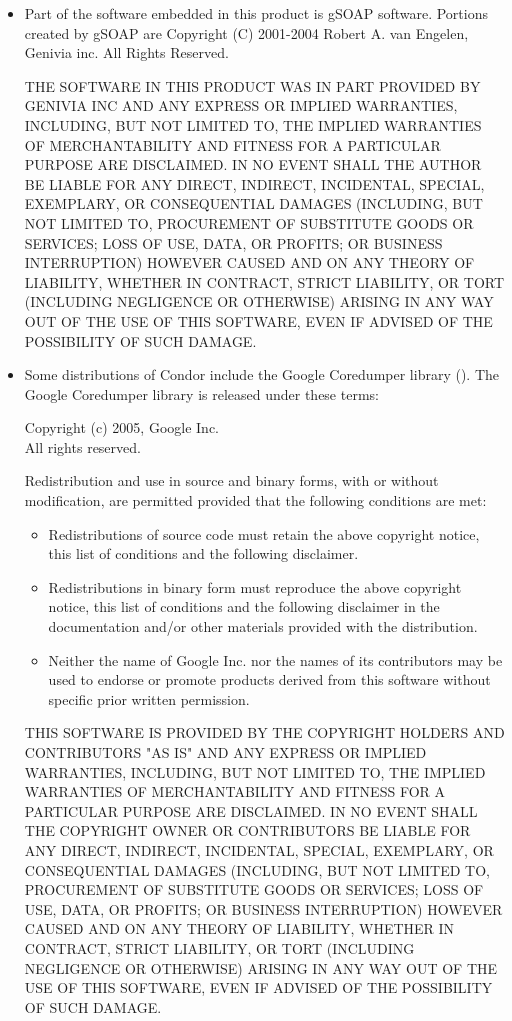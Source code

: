 \begin{itemize}
\item
Part of the software embedded in this product is gSOAP software.
Portions created by gSOAP are Copyright (C) 2001-2004 Robert A. van Engelen, Genivia inc. All Rights Reserved.

THE SOFTWARE IN THIS PRODUCT WAS IN PART PROVIDED BY GENIVIA INC AND ANY EXPRESS OR IMPLIED WARRANTIES, INCLUDING, BUT NOT LIMITED TO, THE IMPLIED WARRANTIES OF MERCHANTABILITY AND FITNESS FOR A PARTICULAR PURPOSE ARE DISCLAIMED. IN NO EVENT SHALL THE AUTHOR BE LIABLE FOR ANY DIRECT, INDIRECT, INCIDENTAL, SPECIAL, EXEMPLARY, OR CONSEQUENTIAL DAMAGES (INCLUDING, BUT NOT LIMITED TO, PROCUREMENT OF SUBSTITUTE GOODS OR SERVICES; LOSS OF USE, DATA, OR PROFITS; OR BUSINESS INTERRUPTION) HOWEVER CAUSED AND ON ANY THEORY OF LIABILITY, WHETHER IN CONTRACT, STRICT LIABILITY, OR TORT (INCLUDING NEGLIGENCE OR OTHERWISE) ARISING IN ANY WAY OUT OF THE USE OF THIS SOFTWARE, EVEN IF ADVISED OF THE POSSIBILITY OF SUCH DAMAGE.

\item
Some distributions of Condor include the Google Coredumper library
().  The Google Coredumper
library is released under these terms:

Copyright (c) 2005, Google Inc. \\
All rights reserved.

Redistribution and use in source and binary forms, with or without
modification, are permitted provided that the following conditions are
met:

	\begin{itemize}
    \item Redistributions of source code must retain the above copyright
notice, this list of conditions and the following disclaimer.

    \item Redistributions in binary form must reproduce the above
copyright notice, this list of conditions and the following disclaimer
in the documentation and/or other materials provided with the
distribution.

    \item Neither the name of Google Inc. nor the names of its
contributors may be used to endorse or promote products derived from
this software without specific prior written permission.
	\end{itemize}

THIS SOFTWARE IS PROVIDED BY THE COPYRIGHT HOLDERS AND CONTRIBUTORS
"AS IS" AND ANY EXPRESS OR IMPLIED WARRANTIES, INCLUDING, BUT NOT
LIMITED TO, THE IMPLIED WARRANTIES OF MERCHANTABILITY AND FITNESS FOR
A PARTICULAR PURPOSE ARE DISCLAIMED. IN NO EVENT SHALL THE COPYRIGHT
OWNER OR CONTRIBUTORS BE LIABLE FOR ANY DIRECT, INDIRECT, INCIDENTAL,
SPECIAL, EXEMPLARY, OR CONSEQUENTIAL DAMAGES (INCLUDING, BUT NOT
LIMITED TO, PROCUREMENT OF SUBSTITUTE GOODS OR SERVICES; LOSS OF USE,
DATA, OR PROFITS; OR BUSINESS INTERRUPTION) HOWEVER CAUSED AND ON ANY
THEORY OF LIABILITY, WHETHER IN CONTRACT, STRICT LIABILITY, OR TORT
(INCLUDING NEGLIGENCE OR OTHERWISE) ARISING IN ANY WAY OUT OF THE USE
OF THIS SOFTWARE, EVEN IF ADVISED OF THE POSSIBILITY OF SUCH DAMAGE.

\end{itemize}
